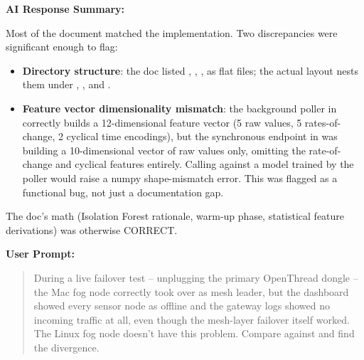 \documentclass[conference]{IEEEtran}
\begin{document}
\noindent\textbf{AI Response Summary:}\par

Most of the document matched the implementation. Two discrepancies were significant enough to flag:

\begin{itemize}
\setlength{\itemsep}{2pt}
\item \textbf{Directory structure}: the doc listed \texttt{}, \texttt{}, \texttt{}, \texttt{} as flat files; the actual layout nests them under \texttt{}, \texttt{}, and \texttt{}.
\item \textbf{Feature vector dimensionality mismatch}: the background poller in \texttt{} correctly builds a 12-dimensional feature vector (5 raw values, 5 rates-of-change, 2 cyclical time encodings), but the synchronous \texttt{} endpoint in \texttt{} was building a 10-dimensional vector of raw values only, omitting the rate-of-change and cyclical features entirely. Calling \texttt{} against a model trained by the poller would raise a numpy shape-mismatch error. This was flagged as a functional bug, not just a documentation gap.
\end{itemize}

The doc's math (Isolation Forest rationale, warm-up phase, statistical feature derivations) was otherwise CORRECT.

\par\vspace{4pt}\par\vspace{2pt}

\noindent\textbf{User Prompt:}\par

\begin{quote}
During a live failover test -- unplugging the primary OpenThread dongle -- the Mac fog node correctly took over as mesh leader, but the dashboard showed every sensor node as offline and the gateway logs showed no incoming traffic at all, even though the mesh-layer failover itself worked. The Linux fog node doesn't have this problem. Compare \texttt{} against \texttt{} and find the divergence.
\end{quote}
\end{document}
